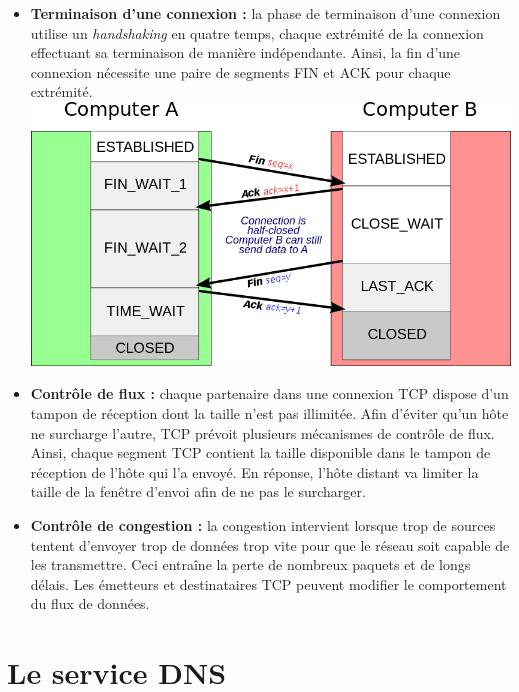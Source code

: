 \documentclass[a4paper,9pt, twocolumn]{article}
\begin{document}
\begin{itemize}
		\item \textbf{Terminaison d'une connexion :}
			la phase de terminaison d'une connexion utilise un \emph{handshaking} en quatre temps, chaque extrémité de la connexion effectuant sa terminaison de manière indépendante.
			Ainsi, la fin d'une connexion nécessite une paire de segments FIN et ACK pour chaque extrémité.
			\includegraphics[scale=0.28]{term.png}
		\item \textbf{Contrôle de flux :}
			chaque partenaire dans une connexion TCP dispose d'un tampon de réception dont la taille n'est pas illimitée.
			Afin d'éviter qu'un hôte ne surcharge l'autre, TCP prévoit plusieurs mécanismes de contrôle de flux.
			Ainsi, chaque segment TCP contient la taille disponible dans le tampon de réception de l'hôte qui l'a envoyé.
			En réponse, l'hôte distant va limiter la taille de la fenêtre d'envoi afin de ne pas le surcharger.
		\item \textbf{Contrôle de congestion :}
			la congestion intervient lorsque trop de sources tentent d'envoyer trop de données trop vite pour que le réseau soit capable de les transmettre. Ceci entraîne la perte de nombreux paquets et de longs délais. Les émetteurs et destinataires TCP peuvent modifier le comportement du flux de données.
	\end{itemize}


\section*{Le service DNS}
\end{document}
